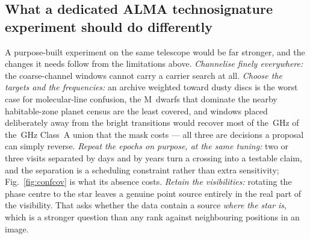 \subsection{What a dedicated ALMA technosignature experiment should do
differently}
\label{sec:future}

A purpose-built experiment on the same telescope would be far stronger, and
the changes it needs follow from the limitations above. \emph{Channelise
finely everywhere:} the \NCoarse{} coarse-channel windows cannot carry a
carrier search at all.
\emph{Choose the targets and the frequencies:} an archive weighted toward
dusty discs is the worst case for molecular-line confusion, the M~dwarfs that
dominate the nearby habitable-zone planet census are the least covered, and
windows placed deliberately away from the bright transitions would recover
most of the \MkMaskAGHz\,GHz of the \CvUnionA\,GHz Class~A union that the
mask costs --- all three are decisions a
proposal can simply reverse. \emph{Repeat the epochs on purpose, at the same
tuning:} two or three visits separated by days and by years turn a crossing
into a testable claim, and the separation is a scheduling constraint rather
than extra sensitivity; Fig.~\ref{fig:confcov} is what its absence costs.
\emph{Retain the visibilities:} rotating the phase centre to the star leaves a
genuine point source entirely in the real part of the visibility. That asks
whether the data contain a source \emph{where the star is}, which is a
stronger question than any rank
against neighbouring positions in an image.

